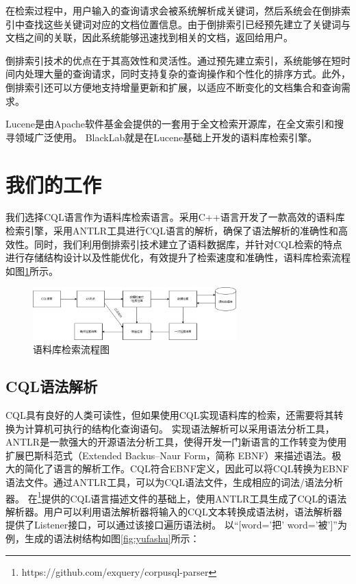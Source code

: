 \documentclass[11pt]{article}
\begin{document}
\begin{CJK*}{UTF8}{gbsn}
在检索过程中，用户输入的查询请求会被系统解析成关键词，然后系统会在倒排索引中查找这些关键词对应的文档位置信息。由于倒排索引已经预先建立了关键词与文档之间的关联，因此系统能够迅速找到相关的文档，返回给用户。

倒排索引技术的优点在于其高效性和灵活性。通过预先建立索引，系统能够在短时间内处理大量的查询请求，同时支持复杂的查询操作和个性化的排序方式。此外，倒排索引还可以方便地支持增量更新和扩展，以适应不断变化的文档集合和查询需求。


Lucene是由Apache软件基金会提供的一套用于全文检索开源库，在全文索引和搜寻领域广泛使用。 BlackLab就是在Lucene基础上开发的语料库检索引擎。


\section{我们的工作}

我们选择CQL语言作为语料库检索语言。采用C++语言开发了一款高效的语料库检索引擎，采用ANTLR工具进行CQL语言的解析，确保了语法解析的准确性和高效性。同时，我们利用倒排索引技术建立了语料数据库，并针对CQL检索的特点进行存储结构设计以及性能优化，有效提升了检索速度和准确性，语料库检索流程如图\ref{fig:liucheng}所示。

\begin{figure}[!h]
	\centering
	\includegraphics[width=0.7\textwidth]{image/liuchengtu.jpg}
	\caption{语料库检索流程图}
	\label{fig:liucheng}
\end{figure}



\subsection{CQL语法解析}

CQL具有良好的人类可读性，但如果使用CQL实现语料库的检索，还需要将其转换为计算机可执行的结构化查询语句。
实现语法解析可以采用语法分析工具，ANTLR是一款强大的开源语法分析工具，使得开发一门新语言的工作转变为使用扩展巴斯科范式（Extended Backus–Naur Form，简称 EBNF）来描述语法。极大的简化了语言的解析工作。CQL符合EBNF定义，因此可以将CQL转换为EBNF语法文件。通过ANTLR工具，可以为CQL语法文件，生成相应的词法/语法分析器。
在\footnote[1]{https://github.com/exquery/corpusql-parser}提供的CQL语言描述文件的基础上，使用ANTLR工具生成了CQL的语法解析器。用户可以利用语法解析器将输入的CQL文本转换成语法树，语法解析器提供了Listener接口，可以通过该接口遍历语法树。
以“[word='把' \textbar word='被']”为例，生成的语法树结构如图\ref{fig:yufashu}所示：


\end{CJK*}
\end{document}
